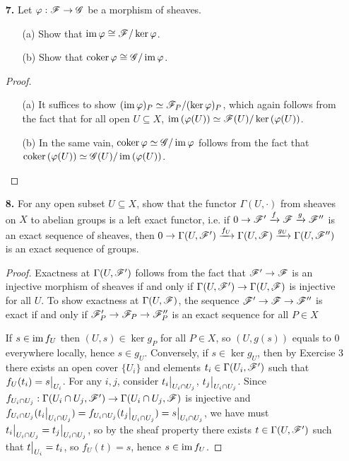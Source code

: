 \documentclass{article}
\begin{document}
\begin{enumerate} [label=\textbf{\arabic*.}, leftmargin=0em]
\item[\textbf{7.}] Let $\varphi : \mathscr{F} \to \mathscr{G}$ be a morphism of sheaves.
\begin{itemize}
    \item[(a)] Show that $\operatorname{im}{\varphi} \cong \mathscr{F} / \ker{\varphi}$.
    \item[(b)] Show that $\operatorname{coker}{\varphi} \cong \mathscr{G} / \operatorname{im}{\varphi}$.
\end{itemize}

\begin{proof} $ $ \vspace{0pt}
   \begin{itemize} [leftmargin=0cm]
    \item[(a)] It suffices to show $(\operatorname{im}{\varphi})_P \simeq \mathscr{F}_P / (\ker{\varphi})_P$, which again follows from the fact that for all open $U \subseteq X$, $\operatorname{im}{(\varphi(U))} \simeq \mathscr{F}(U) / \ker{(\varphi(U))}$.

    \item[(b)] In the same vain, $\operatorname{coker}{\varphi} \simeq \mathscr{G} / \operatorname{im}{\varphi}$ follows from the fact that $\operatorname{coker}{(\varphi(U))} \simeq \mathscr{G}(U) / \operatorname{im}{(\varphi(U))}$.
   \end{itemize} 
\end{proof}

\item[\textbf{8.}] For any open subset $U \subseteq X$, show that the functor $\Gamma(U, \cdot)$ from sheaves on $X$ to abelian groups is a left exact functor, i.e. if $0 \to \mathscr{F}' \xrightarrow{f} \mathscr{F} \xrightarrow{g} \mathscr{F}''$ is an exact sequence of sheaves, then $0 \to \Gamma(U, \mathscr{F}') \xrightarrow{f_U} \Gamma(U, \mathscr{F}) \xrightarrow{g_U} \Gamma(U, \mathscr{F}'')$ is an exact sequence of groups.

\begin{proof}
    Exactness at $\Gamma(U, \mathscr{F}')$ follows from the fact that $\mathscr{F}' \to \mathscr{F}$ is an injective morphism of sheaves if and only if $\Gamma(U, \mathscr{F}') \to \Gamma(U, \mathscr{F})$ is injective for all $U$. To show exactness at $\Gamma(U, \mathscr{F})$, the sequence $\mathscr{F}' \to \mathscr{F} \to \mathscr{F}''$ is exact if and only if $\mathscr{F}'_P \to \mathscr{F}_P \to \mathscr{F}''_P$ is an exact sequence for all $P \in X$ 
    
    If $s \in \operatorname{im}{f_U}$ then $(U, s) \in \ker{g_P}$ for all $P \in X$, so $(U, g(s))$ equals to $0$ everywhere locally, hence $s \in g_U$. Conversely, if $s \in \ker{g_U}$, then by Exercise 3 there exists an open cover $\{ U_i \}$ and elements $t_i \in \Gamma(U_i, \mathscr{F}')$ such that $f_U(t_i) = \restr{s}{U_i}$. For any $i, j$, consider $\restr{t_i}{U_i \cap U_j}$, $\restr{t_j}{U_i \cap U_j}$. Since $f_{U_{i} \cap U_j} : \Gamma(U_i \cap U_j, \mathscr{F}') \to \Gamma(U_i \cap U_j, \mathscr{F})$ is injective and $f_{U_i \cap U_j}(\restr{t_i}{U_i \cap U_j}) = f_{U_i \cap U_j}(\restr{t_{j}}{U_i \cap U_j}) = \restr{s}{U_i \cap U_j}$, we have must $\restr{t_i}{U_i \cap U_j} = \restr{t_j}{U_i \cap U_j}$, so by the sheaf property there exists $t \in \Gamma(U, \mathscr{F}')$ such that $\restr{t}{U_i} = t_i$, so $f_U(t) = s$, hence $s \in \operatorname{im}{f_U}$.
\end{proof}


\end{enumerate}
\end{document}
